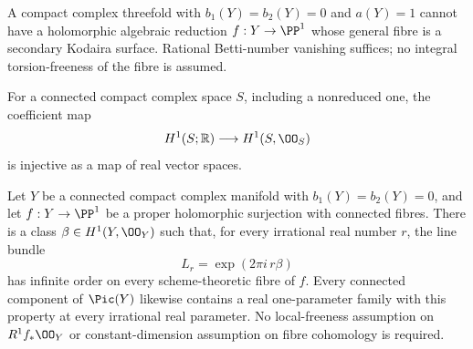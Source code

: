 
\begin{proposition}\hypertarget{tag-01FF}{}\label{cdp:st:C.3.9}



A compact complex threefold with $b_1(Y)=b_2(Y)=0$ and
$a(Y)=1$ cannot have a holomorphic algebraic reduction
$f:Y\to\PP^1$ whose general fibre is a secondary Kodaira
surface. Rational Betti-number vanishing suffices; no integral
torsion-freeness of the fibre is assumed.
\end{proposition}

\begin{proposition}\hypertarget{tag-01G5}{}\label{cdp:st:D.1.7}


For a connected compact complex space $S$, including a nonreduced
one, the coefficient map
\[
H^1(S;\mathbb R)\longrightarrow H^1(S,\OO_S)
\]
is injective as a map of real vector spaces.
\end{proposition}

\begin{proposition}\hypertarget{tag-01G7}{}\label{cdp:st:D.1.9}


Let $Y$ be a connected compact complex manifold with
$b_1(Y)=b_2(Y)=0$, and let $f:Y\to\PP^1$ be a proper
holomorphic surjection with connected fibres. There is a class
$\beta\in H^1(Y,\OO_Y)$ such that, for every irrational real number
$r$, the line bundle
\[
L_r=\exp(2\pi i\,r\beta)
\]
has infinite order on every scheme-theoretic fibre of $f$.
Every connected component of $\Pic(Y)$ likewise contains a real
one-parameter family with this property at every irrational real
parameter.
No local-freeness assumption on $R^1f_*\OO_Y$ or constant-dimension
assumption on fibre cohomology is required.
\end{proposition}

